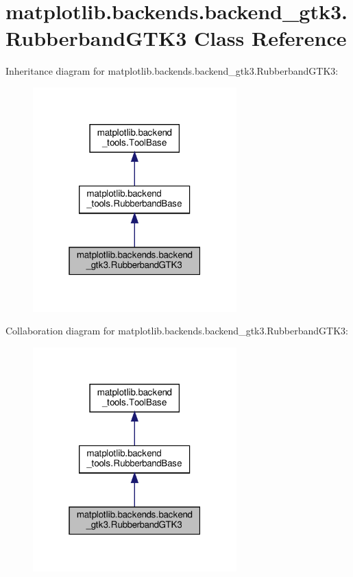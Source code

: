 \hypertarget{classmatplotlib_1_1backends_1_1backend__gtk3_1_1RubberbandGTK3}{}\section{matplotlib.\+backends.\+backend\+\_\+gtk3.\+Rubberband\+G\+T\+K3 Class Reference}
\label{classmatplotlib_1_1backends_1_1backend__gtk3_1_1RubberbandGTK3}


Inheritance diagram for matplotlib.\+backends.\+backend\+\_\+gtk3.\+Rubberband\+G\+T\+K3\+:
\nopagebreak
\begin{figure}[H]
\begin{center}
\leavevmode
\includegraphics[width=223pt]{classmatplotlib_1_1backends_1_1backend__gtk3_1_1RubberbandGTK3__inherit__graph}
\end{center}
\end{figure}


Collaboration diagram for matplotlib.\+backends.\+backend\+\_\+gtk3.\+Rubberband\+G\+T\+K3\+:
\nopagebreak
\begin{figure}[H]
\begin{center}
\leavevmode
\includegraphics[width=223pt]{classmatplotlib_1_1backends_1_1backend__gtk3_1_1RubberbandGTK3__coll__graph}
\end{center}
\end{figure}
